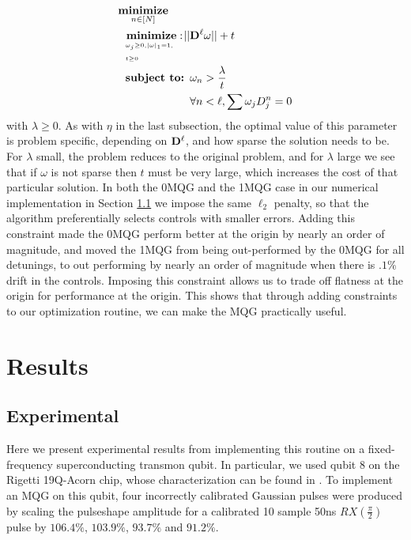 \documentclass[aps,nofootinbib,pra,notitlepage,twocolumn]{revtex4-1}
\begin{document}
\begin{equation}\label{eq:minimization_regularization}
\begin{split}
&\underset{n\in[N]}{\textbf{minimize}}\\
&\ \ \bunderbrace{\textbf{minimize}: }{\omega_j\geq0, |\omega|_1=1,\\ t\geq0} ||{\bold{D}^{\ell}}\omega|| + t\\
&\ \ \textbf{subject to: } \omega_n > \frac{\lambda}{t}\\
&\ \ \phantom{\textbf{subject to: }} \forall n<\ell, \sum \omega_jD_j^n=0
\end{split}
\end{equation} with $\lambda\geq0$. As with $\eta$ in the last subsection, the optimal value of this parameter is problem specific, depending on $\bold{D}^\ell$, and how sparse the solution needs to be. For $\lambda$ small, the problem reduces to the original problem, and for $\lambda$ large we see that if $\omega$ is not sparse then $t$ must be very large, which increases the cost of that particular solution.
In both the 0MQG and the 1MQG case in our numerical implementation in Section \ref{sub:experimental} we impose the same $\ell_2$ penalty, so that the algorithm preferentially selects controls with smaller errors. Adding this constraint made the 0MQG perform better at the origin by nearly an order of magnitude, and moved the 1MQG from being out-performed by the 0MQG for all detunings, to out performing by nearly an order of magnitude when there is $.1\%$ drift in the controls. Imposing this constraint allows us to trade off flatness at the origin for performance at the origin. This shows that through adding constraints to our optimization routine, we can make the MQG practically useful. 
\section{Results} %
\label{sec:results}


\subsection{Experimental} %
\label{sub:experimental}
Here we present experimental results from implementing this routine on a fixed-frequency superconducting transmon qubit. In particular, we used qubit 8 on the Rigetti 19Q-Acorn chip, whose characterization can be found in \cite{1712.05771}. To implement an MQG on this qubit, four incorrectly calibrated Gaussian pulses were produced by scaling the pulseshape amplitude for a calibrated 10 sample 50ns $RX(\frac{\pi}{2})$ pulse by $106.4\%$,  $103.9\%$, $93.7\%$ and $91.2\%$.
\end{document}
